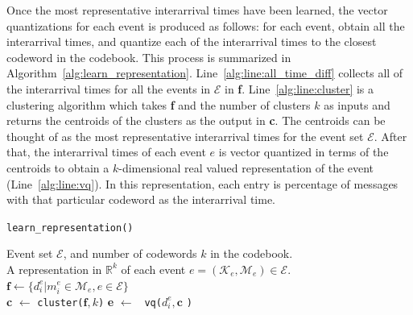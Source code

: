 Once the most representative interarrival times have been learned,
the vector quantizations for each event is produced as follows:
for each event, obtain all the interarrival times, and
quantize each of the interarrival times to the closest codeword
in the codebook.  This process is summarized in
Algorithm~\ref{alg:learn_representation}.
Line~\ref{alg:line:all_time_diff} collects all of the interarrival
times for all the events in $\mathcal{E}$ in
\textbf{f}. Line~\ref{alg:line:cluster} is a clustering algorithm
which takes \textbf{f} and the number of
clusters $k$ as inputs and returns the centroids of the clusters as
the output in \textbf{c}. The centroids can be thought of as the most
representative interarrival times for the event set $\mathcal{E}$. After that,
the interarrival times of each event $e$ is vector
quantized in terms of the centroids to obtain a $k$-dimensional real
valued representation of the event (Line~\ref{alg:line:vq}). 
In this representation, each entry is percentage of messages with that
particular codeword as the interarrival time.
\begin{algorithm}
  \caption{{\tt learn\_representation()}}
  \label{alg:learn_representation}
  \begin{algorithmic}[1]
    \REQUIRE Event set $\mathcal{E}$, and number of codewords $k$ in the codebook.\\
    \ENSURE A representation in $\mathbb{R}^{k}$ of each event $e = (\mathcal{K}_e, \mathcal{M}_e) \in \mathcal{E}$.\\
    \STATE $\textbf{f} \leftarrow \{d_{i}^e| m_{i}^e \in
    \mathcal{M}_e, e \in \mathcal{E} \}$
    \\ \label{alg:line:all_time_diff} \STATE \textbf{c} $\leftarrow$
    {\tt cluster(}$\textbf{f}, k${\tt)} \label{alg:line:cluster}
     \STATE \textbf{e} $\leftarrow$ {\tt
      vq(}$d_{i}^e, \textbf{c}$ {\tt)}\\ \label{alg:line:vq}
    \ENDFOR
  \end{algorithmic}
\end{algorithm}

